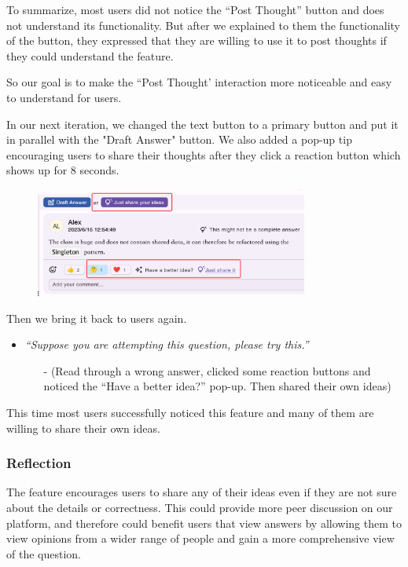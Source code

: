\documentclass[a4paper]{article}
\begin{document}
    To summarize, most users did not notice the ``Post Thought'' button and does not understand its functionality.
    But after we explained to them the functionality of the button, they expressed that they are willing to use it to post thoughts
    if they could understand the feature.

    So our goal is to make the ``Post Thought' interaction more noticeable and easy to understand for users.

    In our next iteration, we changed the text button to a primary button and put it in parallel with the "Draft Answer" button.
    We also added a pop-up tip encouraging users to share their thoughts after they click a reaction button which shows up for 8 seconds.

    \begin{figure}[H]
        \centering
        \includegraphics[width=0.8\textwidth]{thought2}
    \end{figure}

    \noindent Then we bring it back to users again.

    \begin{itemize}
        \item \textit{``Suppose you are attempting this question, please try this.''}
        \begin{itemize}
            \item[-] (Read through a wrong answer, clicked some reaction buttons and noticed the ``Have a better idea?'' pop-up. Then shared their own ideas)
        \end{itemize}
    \end{itemize}

    This time most users successfully noticed this feature and many of them are willing to share their own ideas.

    \subsubsection*{Reflection}

    The feature encourages users to share any of their ideas even if they are not sure about the details or correctness.
    This could provide more peer discussion on our platform, and therefore could benefit users that view answers
    by allowing them to view opinions from a wider range of people and gain a more comprehensive view of the question.
\end{document}
